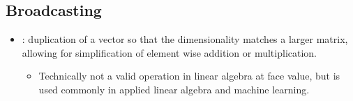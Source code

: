 \begin{itemize}
  \subsection{Broadcasting}\label{Broadcasting}
  \begin{itemize}
    \item {}: duplication of a vector so that the dimensionality matches a larger matrix, allowing for simplification of element wise addition or multiplication. 
      \begin{itemize}
        \item Technically not a valid operation in linear algebra at face value, but is used commonly in applied linear algebra and machine learning.
      \end{itemize}
  \end{itemize}
\end{itemize}

